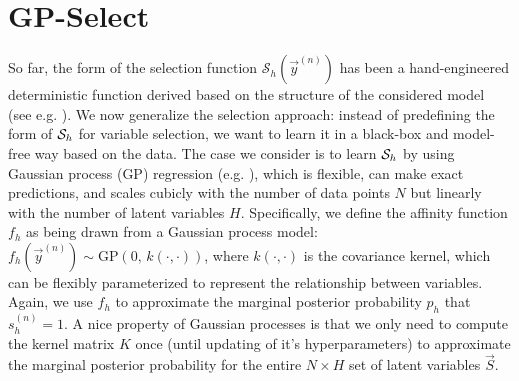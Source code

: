 \section{GP-Select}
%
So far, the form of the selection function $\mathcal{S}_h(\vec{y}^{(n)})$ has been
a hand-engineered deterministic function derived based on the structure of the considered model
(see e.g. \citep{SheltonEtAl2011, SheltonEtAl2012, DaiLucke2012a, DaiLucke2012b,
BornscheinEtAl2013, SheikhEtAl2014}).
%
We now generalize the selection approach:  %
instead of predefining the form of $\mathcal{S}_{h}$ for variable selection, we want
to learn it in a black-box and model-free way based on the data.
%
The case we consider is to learn $\mathcal{S}_{h}$ by using Gaussian process (GP) regression
(e.g. \citep{RasmussenGPbook}), which is flexible, can make exact predictions,
and scales cubicly with the number of data points $N$ but linearly with the number of latent variables $H$.  
%
%
%
%
Specifically, we define the affinity function $f_h$ as being drawn from a Gaussian process model: 
$f_h(\vec{y}^{(n)}) \sim \text{GP}\left(0, \, k(\cdot,\cdot) \right)$, where $k(\cdot, \cdot)$ is the covariance kernel, 
which can be flexibly parameterized to represent the relationship between variables.
Again, we use $f_h$ to approximate the marginal posterior probability $p_h$ that $s_h^{(n)}=1$.
%
A nice property of Gaussian processes is that we only need to compute the kernel matrix $K$ once (until updating of it's hyperparameters) 
to approximate the marginal posterior probability for the entire $N\times H$ set of latent variables $\vec{S}$.

